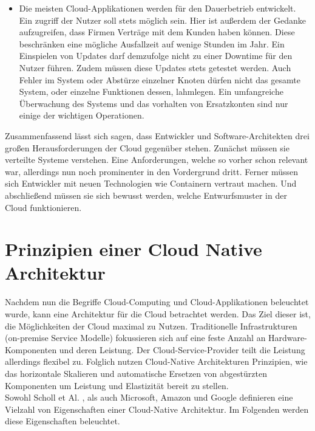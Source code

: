 \begin{itemize}
    \item Die meisten Cloud-Applikationen werden für den Dauerbetrieb entwickelt. Ein zugriff der Nutzer soll stets möglich sein. Hier ist außerdem der Gedanke aufzugreifen, dass Firmen  Verträge mit dem Kunden haben können. Diese beschränken eine mögliche Ausfallzeit auf wenige Stunden im Jahr. Ein Einspielen von Updates darf demzufolge nicht zu einer Downtime für den Nutzer führen. Zudem müssen diese Updates stets getestet werden. Auch Fehler im System oder Abstürze einzelner Knoten dürfen nicht das gesamte System, oder einzelne Funktionen dessen, lahmlegen. Ein umfangreiche Überwachung des Systems und das vorhalten von Ersatzkonten sind nur einige der wichtigen Operationen.\cite{gannon_cloud-native_2017}
\end{itemize}
Zusammenfassend lässt sich sagen, dass Entwickler und Software-Architekten drei großen Herausforderungen der Cloud gegenüber stehen. Zunächst müssen sie verteilte Systeme verstehen. Eine Anforderungen, welche so vorher schon relevant war, allerdings nun noch prominenter in den Vordergrund dritt. Ferner müssen sich Entwickler mit neuen Technologien wie Containern vertraut machen. Und abschließend müssen sie sich bewusst werden, welche Entwurfsmuster in der Cloud funktionieren.

\section{Prinzipien einer Cloud Native Architektur}
Nachdem nun die Begriffe Cloud-Computing und Cloud-Applikationen beleuchtet wurde, kann eine Architektur für die Cloud betrachtet werden. Das Ziel dieser ist, die Möglichkeiten der Cloud maximal zu Nutzen. Traditionelle Infrastrukturen (on-premise Service Modelle) fokussieren sich auf eine feste Anzahl an Hardware-Komponenten und deren Leistung. Der Cloud-Service-Provider teilt die Leistung allerdings flexibel zu. Folglich nutzen Cloud-Native Architekturen Prinzipien, wie das horizontale Skalieren und automatische Ersetzen von abgestürzten Komponenten um Leistung und Elastizität bereit zu stellen.\\
Sowohl Scholl et Al.\cite{scholl_cloud_2019} , als auch Microsoft, Amazon und Google \cite{tom_grey_5_nodate} definieren eine Vielzahl von Eigenschaften einer Cloud-Native Architektur. Im Folgenden werden diese Eigenschaften beleuchtet. 
